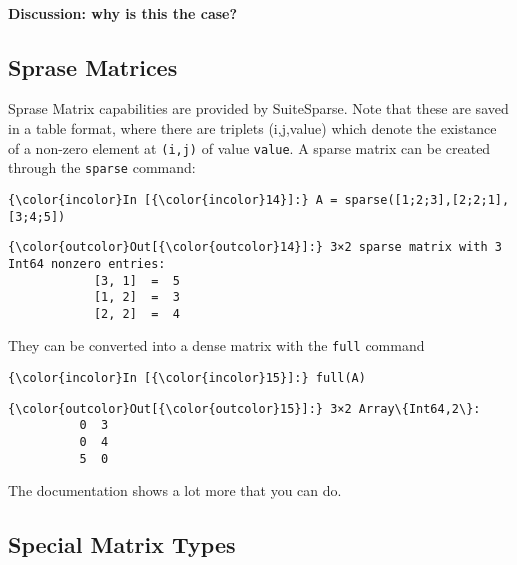 \documentclass[11pt]{article}
\begin{document}
\paragraph{Discussion: why is this the
case?}\label{discussion-why-is-this-the-case}

    \subsection{Sprase Matrices}\label{sprase-matrices}

Sprase Matrix capabilities are provided by SuiteSparse. Note that these
are saved in a table format, where there are triplets (i,j,value) which
denote the existance of a non-zero element at \texttt{(i,j)} of value
\texttt{value}. A sparse matrix can be created through the
\texttt{sparse} command:

    \begin{Verbatim}[commandchars=\\\{\}]
{\color{incolor}In [{\color{incolor}14}]:} A = sparse([1;2;3],[2;2;1],[3;4;5])
\end{Verbatim}

            \begin{Verbatim}[commandchars=\\\{\}]
{\color{outcolor}Out[{\color{outcolor}14}]:} 3×2 sparse matrix with 3 Int64 nonzero entries:
         	[3, 1]  =  5
         	[1, 2]  =  3
         	[2, 2]  =  4
\end{Verbatim}
        
    They can be converted into a dense matrix with the \texttt{full} command

    \begin{Verbatim}[commandchars=\\\{\}]
{\color{incolor}In [{\color{incolor}15}]:} full(A)
\end{Verbatim}

            \begin{Verbatim}[commandchars=\\\{\}]
{\color{outcolor}Out[{\color{outcolor}15}]:} 3×2 Array\{Int64,2\}:
          0  3
          0  4
          5  0
\end{Verbatim}
        
    The documentation shows a lot more that you can do.

    \subsection{Special Matrix Types}\label{special-matrix-types}
\end{document}
